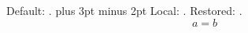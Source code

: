 \documentclass{article}
\begin{document}
\makeatletter
Default: \the\@mathmargin.
{\mathindent=12pt plus 3pt minus 2pt\relax
Local: \the\@mathmargin.}
Restored: \the\@mathmargin.
\makeatother
\begin{equation}a=b\end{equation}
\end{document}

